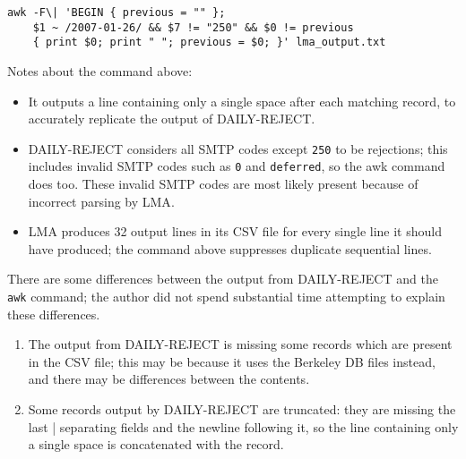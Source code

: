 
\begin{verbatim}
awk -F\| 'BEGIN { previous = "" };
    $1 ~ /2007-01-26/ && $7 != "250" && $0 != previous 
    { print $0; print " "; previous = $0; }' lma_output.txt
\end{verbatim}

Notes about the command above:

\begin{itemize}

    \item It outputs a line containing only a single space after each
        matching record, to accurately replicate the output of
        DAILY-REJECT\@.

    \item DAILY-REJECT considers all \gls{SMTP} codes except \texttt{250}
        to be rejections; this includes invalid \gls{SMTP} codes such as
        \texttt{0} and \texttt{deferred}, so the awk command does too.
        These invalid \gls{SMTP} codes are most likely present because of
        incorrect parsing by \gls{LMA}.

    \item \gls{LMA} produces 32 output lines in its \gls{CSV} file for
        every single line it should have produced; the command above
        suppresses duplicate sequential lines.

\end{itemize}

There are some differences between the output from DAILY-REJECT and the
\texttt{awk} command; the author did not spend substantial time attempting
to explain these differences.

\begin{enumerate}

    \item The output from DAILY-REJECT is missing some records which are
        present in the \gls{CSV} file; this may be because it uses the
        Berkeley DB files instead, and there may be differences between the
        contents.

    \item Some records output by DAILY-REJECT are truncated: they are
        missing the last | separating fields and the newline following it,
        so the line containing only a single space is concatenated with the
        record.

\end{enumerate}


